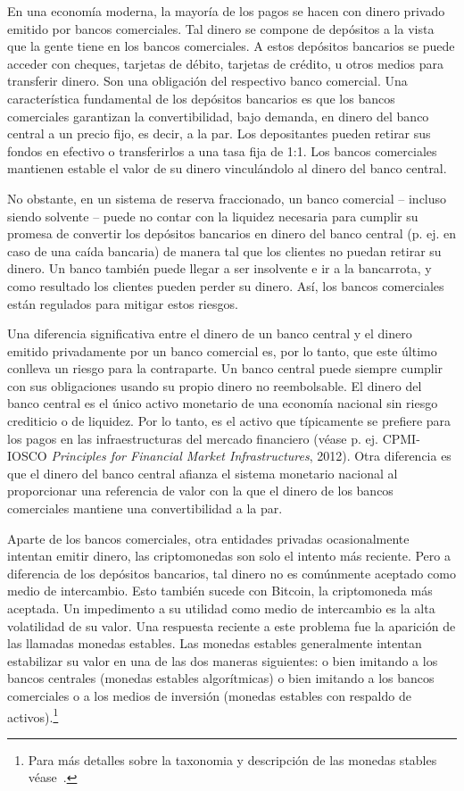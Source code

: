 \documentclass[10pt,spanish]{article}
\begin{document}
En una economía moderna, la mayoría de los pagos se hacen con dinero
privado emitido por bancos comerciales. Tal dinero se compone de
depósitos a la vista que la gente tiene en los bancos comerciales. A
estos depósitos bancarios se puede acceder con cheques, tarjetas de
débito, tarjetas de crédito, u otros medios para transferir dinero. Son
una obligación del respectivo banco comercial. Una característica
fundamental de los depósitos bancarios es que los bancos comerciales
garantizan la convertibilidad, bajo demanda, en dinero del banco central
a un precio fijo, es decir, a la par. Los depositantes pueden retirar
sus fondos en efectivo o transferirlos a una tasa fija de 1:1. Los
bancos comerciales mantienen estable el valor de su dinero vinculándolo
al dinero del banco central.

No obstante, en un sistema de reserva fraccionado, un banco comercial
-- incluso siendo solvente -- puede no contar con la liquidez necesaria
para cumplir su promesa de convertir los depósitos bancarios en dinero
del banco central (p. ej. en caso de una caída bancaria) de manera tal
que los clientes no puedan retirar su dinero. Un banco también puede
llegar a ser insolvente e ir a la bancarrota, y como resultado los
clientes pueden perder su dinero. Así, los bancos comerciales están
regulados para mitigar estos riesgos.

Una diferencia significativa entre el dinero de un banco central y el
dinero emitido privadamente por un banco comercial es, por lo tanto, que
este último conlleva un riesgo para la contraparte. Un banco central
puede siempre cumplir con sus obligaciones usando su propio dinero no
reembolsable. El dinero del banco central es el único activo monetario
de una economía nacional sin riesgo crediticio o de liquidez. Por lo
tanto, es el activo que típicamente se prefiere para los pagos en las
infraestructuras del mercado financiero (véase p. ej. CPMI-IOSCO
\emph{Principles for Financial Market Infrastructures}, 2012). Otra
diferencia es que el dinero del banco central afianza el sistema
monetario nacional al proporcionar una referencia de valor con la que el
dinero de los bancos comerciales mantiene una convertibilidad a la par.

Aparte de los bancos comerciales, otra entidades privadas ocasionalmente
intentan emitir dinero, las criptomonedas son solo el intento más
reciente. Pero a diferencia de los depósitos bancarios, tal dinero no es
comúnmente aceptado como medio de intercambio. Esto también sucede con
Bitcoin, la criptomoneda más aceptada. Un impedimento a su utilidad como
medio de intercambio es la alta volatilidad de su valor. Una respuesta
reciente a este problema fue la aparición de las llamadas monedas
estables. Las monedas estables generalmente intentan estabilizar su
valor en una de las dos maneras siguientes: o bien imitando a los bancos
centrales (monedas estables algorítmicas) o bien imitando a los bancos
comerciales o a los medios de inversión (monedas estables con respaldo
de activos).\footnote{Para más detalles sobre la taxonomia y descripción
de las monedas stables véase~\citet{Bullmann}.}
\end{document}

